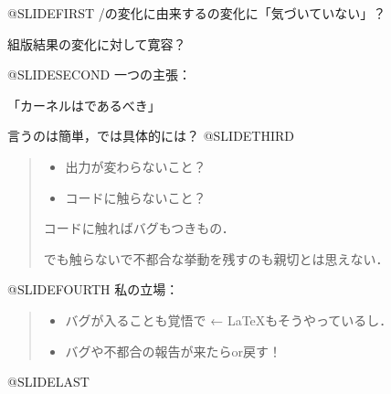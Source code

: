 \documentclass[a4paper,papersize,25pt,slide,dvipdfmx]{jsarticle}
\begin{document}
@SLIDEFIRST
\pTeX/\epTeX の変化に由来する\pLaTeX の変化に「気づいていない」？\par
組版結果の変化に対して寛容？\par\medskip
@SLIDESECOND
一つの主張：
\begin{center}
「\pLaTeX カーネルはであるべき」
\end{center}
言うのは簡単，では具体的には？
@SLIDETHIRD
\begin{quote}
\begin{itemize}
\item 出力が変わらないこと？
\item コードに触らないこと？
\end{itemize}
コードに触ればバグもつきもの．\par
でも触らないで不都合な挙動を残すのも親切とは思えない．
\end{quote}
@SLIDEFOURTH
私の立場：
\begin{quote}
\begin{itemize}
\item バグが入ることも覚悟で\quad
{\small ← \LaTeX もそうやっているし．}
\item バグや不都合の報告が来たらor戻す！
\end{itemize}
\end{quote}
@SLIDELAST
\SLIDEEND
\end{document}
